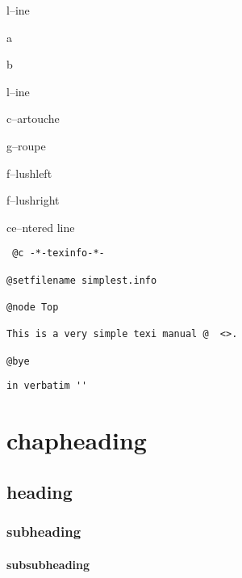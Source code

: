 \documentclass{book}
\begin{document}
l--ine




a




b


l--ine




c--artouche




g--roupe




f--lushleft




f--lushright




ce--ntered line



\begin{verbatim}
 @c -*-texinfo-*-

@setfilename simplest.info

@node Top

This is a very simple texi manual @  <>.

@bye
\end{verbatim}



\begin{verbatim}
in verbatim ''
\end{verbatim}





\chapter*{chapheading}



\section*{heading}



\subsection*{subheading}



\subsubsection*{subsubheading}
\end{document}
